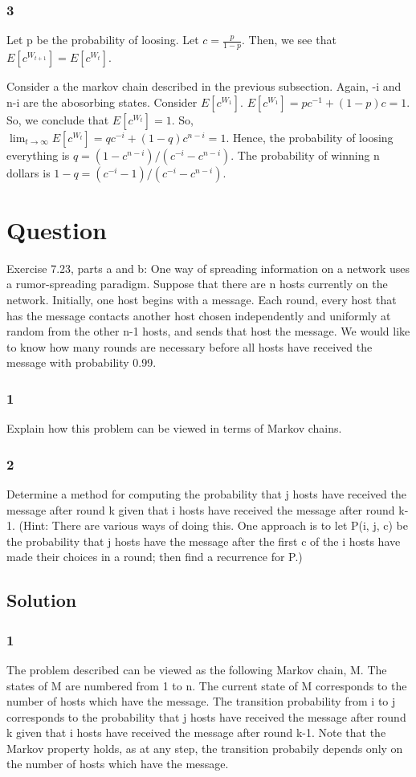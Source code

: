 \documentclass[10pt]{amsart}
\theoremstyle{remark}
\begin{document}
\subsubsection{3}
Let p be the probability of loosing. Let $c=\frac{p}{1-p}$. Then, we see that $E[c^{W_{t+1}}]=E[c^{W_{t}}]$.

Consider a the markov chain described in the previous subsection. Again, -i and n-i are the abosorbing states. Consider $E[c^{W_{1}}]$. $E[c^{W_{1}}] = pc^{-1}+(1-p)c = 1$. So, we conclude that $E[c^{W_{t}}]=1$. So, $\lim_{t \to \infty}E[c^{W_{t}}] = qc^{-i}+(1-q)c^{n-i} =  1$. Hence, the probability of loosing everything is $q= (1-c^{n-i})/(c^{-i}-c^{n-i})$. The probability of winning n dollars is $1-q=(c^{-i}-1)/(c^{-i}-c^{n-i})$.

\section{Question}
Exercise 7.23, parts a and b: One way of spreading information on a network uses a rumor-spreading paradigm. Suppose that there are n hosts currently on the network. Initially, one host begins with a message. Each round, every host that has the message contacts another host chosen independently and uniformly at random from the other n-1 hosts, and sends that host the message. We would like to know how many rounds are necessary before all hosts have received the message with probability 0.99.

\subsubsection{1} Explain how this problem can be viewed in terms of Markov chains.
\subsubsection{2} Determine a method for computing the probability that j hosts have received the message after round k given that i hosts have received the message after round k-1. (Hint: There are various ways of doing this. One approach is to let P(i, j, c) be the probability that j hosts have the message after the first c of the i hosts have made their choices in a round; then find a recurrence for P.)

\subsection{Solution}
\subsubsection{1} The problem described can be viewed as the following Markov chain, M. The states of M are numbered from 1 to n. The current state of M corresponds to the number of hosts which have the message. The transition probability from i to j corresponds to the probability that j hosts have received the message after round k given that i hosts have received the message after round k-1. Note that the Markov property holds, as at any step, the transition probabily depends only on the number of hosts which have the message.
\end{document}
